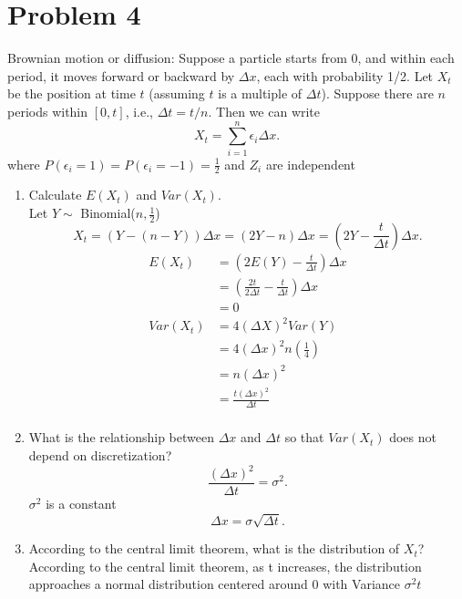 \documentclass{article}
\begin{document}
    \section{Problem 4}
    Brownian motion or diffusion: Suppose a particle starts from 0, and within each
    period, it moves forward or backward by $\Delta x$, each with probability 1/2. Let $X_t$ be the position at
    time $t$ (assuming $t$ is a multiple of $\Delta  t$). Suppose there are $n$ periods within $[0, t]$, i.e., $\Delta  t = t/n$.
    Then we can write
    \[
    X_t=\sum_{i=1}^{n}\epsilon_i\Delta x 
    .\] 
    where $P(\epsilon_i = 1) = P(\epsilon_i = -1) = \frac{1}{2}$ and $Z_i$ are independent
    \begin{enumerate}
        \item
            Calculate $E(X_t)$ and $Var(X_t)$.\\
            Let $Y \sim $ Binomial($n, \frac{1}{2}$)
            \[
            X_t = (Y - (n - Y))\Delta x  = (2Y - n)\Delta x  = (2Y - \frac{t}{\Delta t})\Delta x
            .\] 
            \begin{align*}
                E(X_t) &= (2E(Y) - \frac{t}{\Delta t })\Delta x \\
                       &= (\frac{2t}{2\Delta t } - \frac{t}{\Delta t })\Delta x \\
                       &= 0\\
                Var(X_t) &= 4(\Delta X)^2Var(Y) \\
                         &= 4(\Delta x)^2 n(\frac{1}{4}) \\
                         &= n(\Delta x)^2 \\
                         &= \frac{t(\Delta x)^2}{\Delta t }\\
            \end{align*}
        \item What is the relationship between $\Delta  x$ and $\Delta  t$ so that $Var(X_t)$ does not depend on discretization?
            \[
                \frac{(\Delta x)^2}{\Delta t } = \sigma^2
            .\]
            $\sigma^2$ is a constant
            \[
            \Delta x = \sigma \sqrt{\Delta t }
            .\] 
        \item According to the central limit theorem, what is the distribution of $X_t$?
           According to the central limit theorem, as t increases, the distribution approaches a normal distribution centered around 0 with Variance $\sigma^2t$ 
    \end{enumerate}
\end{document}
